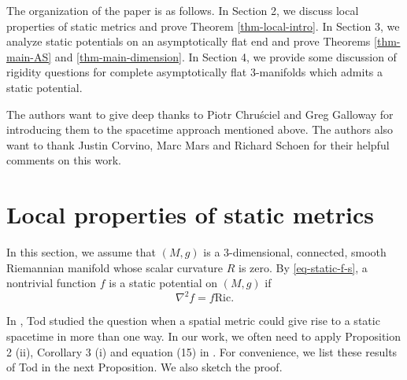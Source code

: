 \documentclass[12pt]{amsart}
\theoremstyle{remark}
\numberwithin{equation}{section}
\newcommand{\Ric}{\mbox{Ric}}
\newcommand{\be}{\begin{equation}}
\newcommand{\ee}{\end{equation}}
\def\AF{asymptotically flat }
\begin{document}
The organization of the paper is as follows.
In Section 2, we discuss local properties of static metrics and prove Theorem \ref{thm-local-intro}.
In Section 3, we analyze static potentials on an asymptotically flat end  and
prove Theorems \ref{thm-main-AS} and \ref{thm-main-dimension}.
In Section 4, we  provide some discussion of  rigidity questions for complete \AF $3$-manifolds
which admits a static potential.

The authors want to give deep thanks to  Piotr Chru\'{s}ciel and Greg Galloway
for introducing them to the spacetime approach mentioned above. The authors also want to  thank Justin Corvino, Marc Mars  
and Richard Schoen for  their  helpful comments  on  this work.


\section{Local properties of static metrics}  \label{section-local}

In this section,  we assume that
 $(M, g) $ is a $3$-dimensional, connected, smooth Riemannian manifold whose scalar curvature $R$ is  zero.
 By \eqref{eq-static-f-s}, a nontrivial function $f$   is a static potential  on $(M, g)$ if 
\be\label{eq-static-1}
 \nabla^2   f = f \Ric   .
\ee

In \cite{Tod-2000}, Tod studied the question when a spatial metric could
give rise to a static spacetime in more than one way.
In our work,
we often need to apply Proposition 2 (ii), Corollary 3 (i) and equation (15) in \cite{Tod-2000}.
 For convenience, we list these results of Tod in the next  Proposition. We also sketch the proof.
\end{document}
